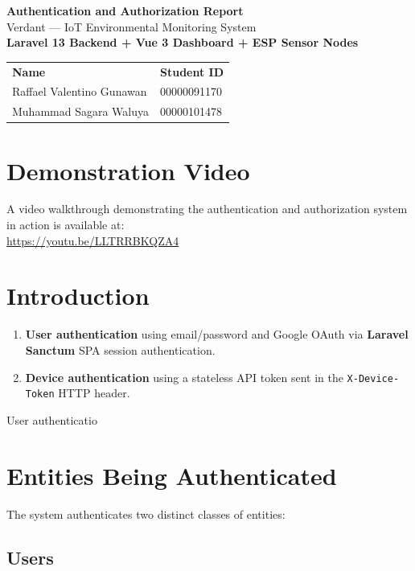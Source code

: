 \documentclass[11pt,a4paper]{article}
\begin{document}
\begin{center}
{\huge\bfseries\color{verdark} Authentication and Authorization Report}\\[0.5em]
{\large Verdant --- IoT Environmental Monitoring System}\\[0.5em]
\textbf{Laravel 13 Backend + Vue 3 Dashboard + ESP Sensor Nodes}\\[1em]
\begin{tabular}{ll}
\textbf{Name} & \textbf{Student ID} \\
Raffael Valentino Gunawan & 00000091170 \\
Muhammad Sagara Waluya & 00000101478 \\
\end{tabular}
\end{center}

\vspace{1em}

\section*{Demonstration Video}
A video walkthrough demonstrating the authentication and authorization system in action is available at:\\
\url{https://youtu.be/LLTRRBKQZA4}

\vspace{0.5em}

\section{Introduction}

\begin{enumerate}[leftmargin=*]
    \item \textbf{User authentication} using email/password and Google OAuth via \textbf{Laravel Sanctum} SPA session authentication.
    \item \textbf{Device authentication} using a stateless API token sent in the \texttt{X-Device-Token} HTTP header.
\end{enumerate}User authenticatio

\section{Entities Being Authenticated}

The system authenticates two distinct classes of entities:

\subsection{Users}
\end{document}
